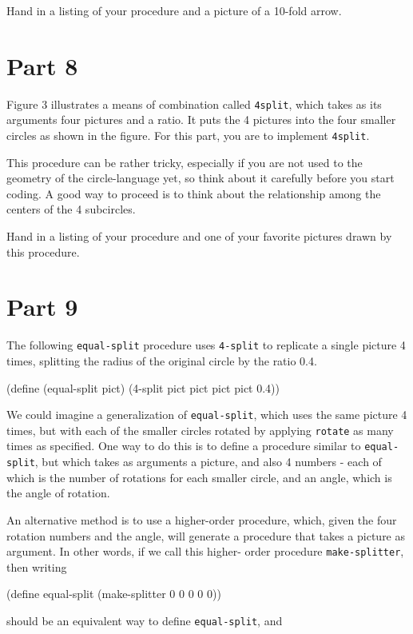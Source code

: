 Hand in a listing of your procedure and a picture of a
10-fold arrow.

\section{Part 8}

\beginfigure
\vskip 4in
\endfigure

Figure 3 illustrates a means of combination called
{\tt 4split}, which takes as its arguments four pictures and a
ratio.  It puts the 4 pictures into the four smaller circles
as shown in the figure.  For this part, you are to implement
{\tt 4split}.

This procedure can be rather tricky, especially if you are not used to
the geometry of the circle-language yet, so think about it carefully
before you start coding.  A good way to proceed is to think about the
relationship among the centers of the 4 subcircles.

Hand in a listing of your procedure and one of your favorite pictures
drawn by this procedure.

\section{Part 9}

The following {\tt equal-split} procedure uses {\tt 4-split} to replicate
a single picture 4 times, splitting the radius of the original circle
by the ratio 0.4.

\beginlisp
(define (equal-split pict)
  (4-split pict pict pict pict 0.4))
\endlisp

We could imagine a generalization of {\tt equal-split}, which uses the
same picture 4 times, but with each of the smaller circles rotated
by applying {\tt rotate} as many times as specified.  One way to do
this is to define a procedure similar to {\tt equal-split}, but which 
takes as arguments a picture, and also 4 numbers - each of which is
the number of rotations for each smaller circle, and an angle, which
is the angle of rotation.  

An alternative method is to use a higher-order procedure, which, given
the four rotation numbers and the angle, will generate a procedure that
takes a picture as argument.  In other words, if we call this higher-
order procedure {\tt make-splitter}, then writing

\beginlisp
(define equal-split (make-splitter 0 0 0 0 0))
\endlisp

should be an equivalent way to define {\tt equal-split}, and

